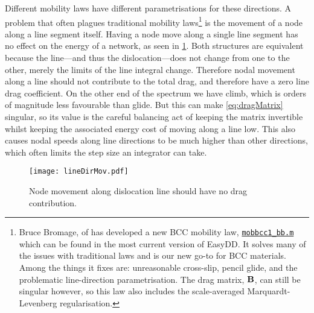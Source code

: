 Different mobility laws have different parametrisations for these directions. A problem that often plagues traditional mobility laws\footnote{Bruce Bromage, of \cite{bromage2018calculating} has developed a new BCC mobility law, \href{https://github.com/TarletonGroup/EasyDD/blob/master/src/mobbcc_bb1b.m}{\texttt{mobbcc1\_bb.m}} which can be found in the most current version of EasyDD. It solves many of the issues with traditional laws and is our new go-to for BCC materials. Among the things it fixes are: unreasonable cross-slip, pencil glide, and the problematic line-direction parametrisation. The drag matrix, $\mathbf{B}$, can still be singular however, so this law also includes the scale-averaged Marquardt-Levenberg regularisation.} is the movement of a node along a line segment itself. Having a node move along a single line segment has no effect on the energy of a network, as seen in \cref{fig:lineMovement}. Both structures are equivalent because the line---and thus the dislocation---does not change from one to the other, merely the limits of the line integral change. Therefore nodal movement along a line should not contribute to the total drag, and therefore have a zero line drag coefficient. On the other end of the spectrum we have climb, which is orders of magnitude less favourable than glide. But this can make \cref{eq:dragMatrix} singular, so its value is the careful balancing act of keeping the matrix invertible whilst keeping the associated energy cost of moving along a line low. This also causes nodal speeds along line directions to be much higher than other directions, which often limits the step size an integrator can take.
\begin{figure}\label{fig:lineMovement}
    \centering
    \texttt{[image: lineDirMov.pdf]}
    \caption{Node movement along dislocation line should have no drag contribution.}
\end{figure}

